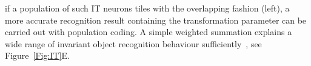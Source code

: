 \documentclass[journal]{journal}
\begin{document}
if a population of such IT neurons tiles with the overlapping fashion (left), a more accurate recognition result containing the transformation parameter can be carried out with population coding.
%
A simple weighted summation explains a wide range of invariant object recognition behaviour sufficiently~\cite{majaj2012unified}, see Figure~\ref{Fig:IT}E.
%
%
\end{document}
